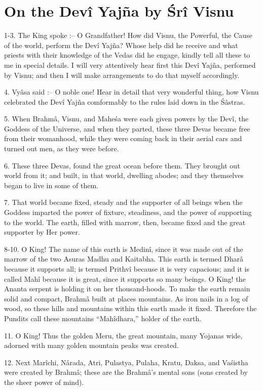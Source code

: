 ﻿\chapter{On the Dev\^i Yaj\~na by \'Sr\^i Visnu}

1-3. The King spoke :-- O Grandfather! How did Visnu, the Powerful, the Cause of the world, perform the Dev\^i Yaj\~na? Whose help did he receive and what priests with their knowledge of the Vedas did he engage, kindly tell all these to me in special details. I will very attentively hear first this Dev\^i Yaj\~na, performed by Visnu; and then I will make arrangements to do that myself accordingly.

4. Vy\^asa said :-- O noble one! Hear in detail that very wonderful thing, how Visnu celebrated the Dev\^i Yaj\~na comformably to the rules laid down in the \'S\^astras.

5. When Brahm\^a, Visnu, and Mahe\'sa were each given powers by the Dev\^i, the Goddess of the Universe, and when they parted, these three Devas became free from their womanhood, while they were coming back in their aerial cars and turned out men, as they were before.

6. These three Devas, found the great ocean before them. They brought out world from it; and built, in that world, dwelling abodes; and they themselves began to live in some of them.

7. That world became fixed, steady and the supporter of all beings when the Goddess imparted the power of fixture, steadiness, and the power of supporting to the world. The earth, filled with marrow, then, became fixed and the great supporter by Her power.

8-10. O King! The name of this earth is Medin\^i, since it was made out of the marrow of the two Asuras Madhu and Kaitabha. This earth is termed Dhar\^a because it supports all; is termed Prithv\^i because it is very capacious; and it is called Mah\^i because it is great, since it supports so many beings. O King! the Ananta serpent is holding it on her thousand-hoods. To make the earth remain solid and compact, Brahm\^a built at places mountains. As iron nails in a log of wood, so these hills and mountains within this earth made it fixed. Therefore the Pundits call these mountains ``Mah\^idhara,'' holder of the earth.

11. O King! Thus the golden Meru, the great mountain, many Yojanas wide, adorned with many golden mountain peaks was created.

12. Next Mar\^ichi, N\^arada, Atri, Pulastya, Pulaha, Kratu, Daksa, and Va\'sistha were created by Brahm\^a; these are the Brahm\^a's mental sons (sons created by the sheer power of mind).

